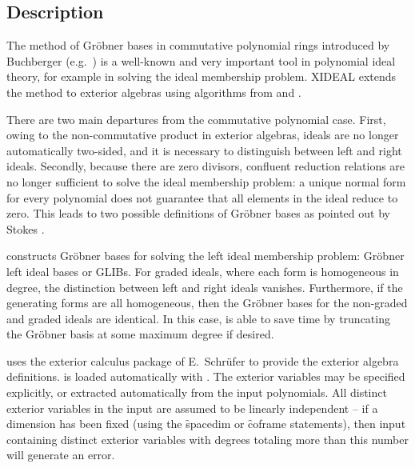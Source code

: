 

\subsection{Description}

The method of Gr{\"o}bner bases in commutative polynomial rings introduced by
Buchberger (e.g.~\cite{Buchberger:85}) is a well-known and very important tool
in polynomial ideal theory, for example in solving the ideal membership
problem. XIDEAL extends the method to exterior algebras using
algorithms from \cite{HartleyTuckey:93} and \cite{Apel:92}.

There are two main departures from the commutative polynomial case. First,
owing to the non-commutative product in exterior algebras, ideals are no
longer automatically two-sided, and it is necessary to distinguish between
left and right ideals. Secondly, because there are zero divisors, confluent
reduction relations are no longer sufficient to solve the ideal membership
problem: a unique normal form for every polynomial does not guarantee that
all elements in the ideal reduce to zero. This leads to two possible
definitions of Gr{\"o}bner bases as pointed out by Stokes \cite{Stokes:90}.

 constructs Gr{\"o}bner bases for solving the left ideal membership
problem: Gr{\"o}bner left ideal bases or GLIBs. For graded ideals, where each
form is homogeneous in degree, the distinction between left and right
ideals vanishes. Furthermore, if the generating forms are all homogeneous,
then the Gr{\"o}bner bases for the non-graded and graded ideals are
identical. In this case,  is able to save time by truncating the
Gr{\"o}bner basis at some maximum degree if desired.

 uses the exterior calculus package  of E.~Schr{\"u}fer
\cite{Schruefer:85} to provide the exterior algebra definitions.  is loaded
automatically with .
The exterior variables may be specified explicitly, or extracted
automatically from the input polynomials.  All distinct exterior variables
in the input are assumed to be linearly independent -- if a dimension has
been fixed (using the  \f{spacedim}
or \f{coframe} statements), then
input containing distinct exterior variables with degrees totaling more
than this number will generate an error.

